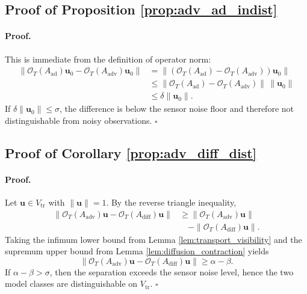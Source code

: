 \subsection{Proof of Proposition \ref{prop:adv_ad_indist}}

\paragraph{Proof.}
This is immediate from the definition of operator norm:
\begin{align}
\|\mathcal{O}_T(A_{\mathrm{ad}})\mathbf{u}_0
-
\mathcal{O}_T(A_{\mathrm{adv}})\mathbf{u}_0\|
&=
\|(\mathcal{O}_T(A_{\mathrm{ad}})-\mathcal{O}_T(A_{\mathrm{adv}}))\mathbf{u}_0\| \nonumber \\
&\le
\|\mathcal{O}_T(A_{\mathrm{ad}})-\mathcal{O}_T(A_{\mathrm{adv}})\|\,
\|\mathbf{u}_0\| \nonumber \\
&\le
\delta \|\mathbf{u}_0\| \nonumber.
\end{align}
If $\delta\|\mathbf{u}_0\|\le \sigma$, the difference is below the sensor noise floor and therefore not distinguishable from noisy observations. \hfill $\square$


\subsection{Proof of Corollary \ref{prop:adv_diff_dist}}
\paragraph{Proof.}
Let $\mathbf{u}\in V_{\mathrm{tr}}$ with $\|\mathbf{u}\|=1$. By the reverse triangle inequality,
\begin{align}
\|\mathcal{O}_T(A_{\mathrm{adv}})\mathbf{u}
-
\mathcal{O}_T(A_{\mathrm{diff}})\mathbf{u}\|
&\ge
\|\mathcal{O}_T(A_{\mathrm{adv}})\mathbf{u}\| \nonumber \\
&\quad -
\|\mathcal{O}_T(A_{\mathrm{diff}})\mathbf{u}\| \nonumber.
\end{align}
Taking the infimum lower bound from Lemma \ref{lem:transport_visibility} and the supremum upper bound from Lemma \ref{lem:diffusion_contraction} yields
\begin{equation}
\|\mathcal{O}_T(A_{\mathrm{adv}})\mathbf{u}
-
\mathcal{O}_T(A_{\mathrm{diff}})\mathbf{u}\|
\ge
\alpha-\beta. \nonumber
\end{equation}
If $\alpha-\beta>\sigma$, then the separation exceeds the sensor noise level, hence the two model classes are distinguishable on $V_{\mathrm{tr}}$. \hfill $\square$







